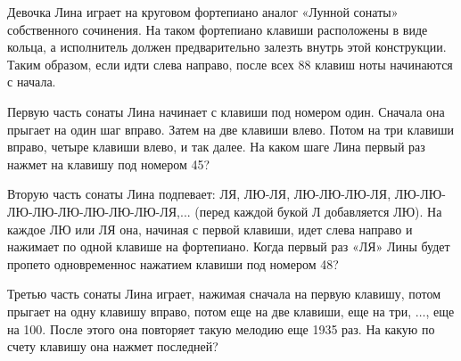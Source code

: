 ﻿

\noindent Девочка Лина играет на круговом фортепиано аналог «Лунной сонаты» собственного сочинения. На таком фортепиано клавиши расположены в виде кольца, а исполнитель должен предварительно залезть внутрь этой конструкции. Таким образом, если идти слева направо, после всех 88 клавиш ноты начинаются с начала.
\begin{itemize}

\itA Первую часть сонаты Лина начинает с клавиши под номером один. Сначала она прыгает на один шаг вправо. Затем на две клавиши влево. Потом на три клавиши вправо, четыре клавиши влево, и так далее. На каком шаге Лина первый раз нажмет на клавишу под номером 45?

\itB Вторую часть сонаты Лина подпевает: ЛЯ, ЛЮ-ЛЯ, ЛЮ-ЛЮ-ЛЮ-ЛЯ, ЛЮ-ЛЮ-ЛЮ-ЛЮ-ЛЮ-ЛЮ-ЛЮ-ЛЮ-ЛЯ,... (перед каждой букой Л добавляется ЛЮ). На каждое ЛЮ или ЛЯ она, начиная с первой клавиши, идет слева направо и нажимает по одной клавише на фортепиано. Когда первый раз «ЛЯ» Лины будет пропето одновременно\linebreak с нажатием клавиши под номером 48?

\itC Третью часть сонаты Лина играет, нажимая сначала на первую клавишу, потом прыгает на одну клавишу вправо, потом еще на две клавиши, еще на три, $\ldots$, еще на 100. После этого она повторяет такую мелодию еще 1935 раз. На какую по счету клавишу она нажмет последней?
\end{itemize}
